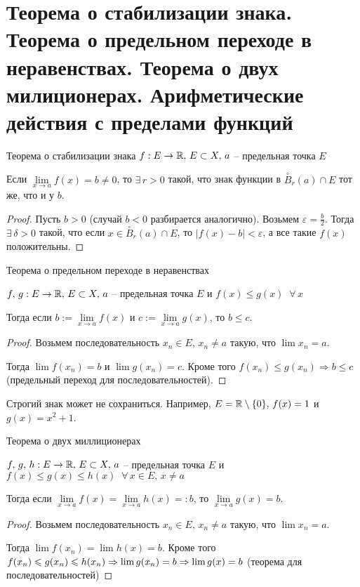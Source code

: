 \section{Теорема о стабилизации знака. Теорема о предельном переходе в неравенствах. Теорема о двух милиционерах. Арифметические действия с пределами функций}

\begin{theorem-non}
    Теорема о стабилизации знака
$f : E \to \mathbb{R}, \, E \subset X, \, a$ -- предельная точка $E$

Если $\lim\limits_{x \to a} f(x) = b \neq 0$, то $\exists \, r > 0$ такой, что знак функции в $\overset{\circ}{B}_r(a) \cap E$ тот же, что и у $b$.
\end{theorem-non}
\begin{proof}
    Пусть $b > 0$ (случай $b < 0$ разбирается аналогично). Возьмем $\varepsilon = \frac{b}{2}$. 
    Тогда $\exists \, \delta > 0$ такой, что если $x \in \overset{\circ}{B}_r(a) \cap E$, то $|f(x) - b| < \varepsilon$,
    а все такие $f(x)$ положительны.
\end{proof}

\begin{theorem-non}
    Теорема о предельном переходе в неравенствах

    $f, \, g : E \to \mathbb{R}, \, E \subset X, \, a$ -- предельная точка $E$ и $f(x) \leqslant g(x) \;\; \forall \, x$

    Тогда если $b := \lim\limits_{x \to a} f(x)$ и $c := \lim\limits_{x \to a} g(x)$, то $b \leqslant c$.
\end{theorem-non}
\begin{proof}
    Возьмем последовательность $x_n \in E, \, x_n \neq a$ такую, что $\lim x_n = a$. 

    Тогда $\lim f(x_n) = b$ и $\lim g(x_n) = c$. Кроме того $f(x_n) \leqslant g(x_n) \Rightarrow b \leqslant c$ (предельный переход для последовательностей).
\end{proof}
\begin{notice}
    Строгий знак может не сохраниться. Например, $E = \mathbb{R} \setminus \{0\}, \, f(x) = 1$ и $g(x) = x^2 + 1$.
\end{notice}

\begin{theorem-non}
    Теорема о двух миллиционерах

    $f, \, g, \, h : E \to \mathbb{R}, \, E \subset X, \, a$ -- предельная точка $E$ и $f(x) \leqslant g(x) \leqslant h(x) \;\; \forall \, x \in E, \, x \neq a$

    Тогда если $\lim\limits_{x \to a} f(x) = \lim\limits_{x \to a} h(x) =: b$, то $\lim\limits_{x \to a} g(x) = b$.
\end{theorem-non}
\begin{proof}
    Возьмем последовательность $x_n \in E, \, x_n \neq a$ такую, что $\lim x_n = a$. 

    Тогда $\lim f(x_n) = \lim h(x) = b$. Кроме того $f(x_n) \leqslant g(x_n) \leqslant h(x_n) \Rightarrow \lim g(x_n) = b \\ \Rightarrow \lim g(x) = b$
    (теорема для последовательностей)
\end{proof}

